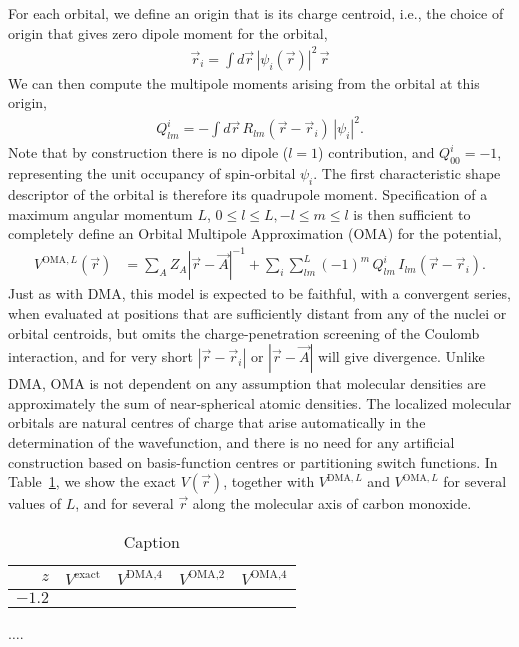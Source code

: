 \documentclass[journal=jacsat,manuscript=article]{achemso}
\begin{document}
For each orbital, we define an origin that is its charge centroid, i.e., the
choice of origin that gives zero dipole moment for the orbital,
\begin{align}
  \vec r_i = \int d \vec r \,|\psi_i(\vec r)|^2 \,  \vec r
\end{align}
We can then compute the multipole moments arising from the orbital at this origin,
\begin{align}
    Q^i_{lm} = -\int d\vec r \, R_{lm}(\vec r-\vec r_i) \, |\psi_i|^2
    .
\end{align}
Note that by construction there is no dipole ($l=1$) contribution, and $Q^i_{00}=-1$, representing the unit occupancy of spin-orbital $\psi_i$. The first characteristic shape descriptor of the orbital is therefore its quadrupole moment.
Specification of a maximum angular momentum $L$, $0\le l\le L, -l\le m\le l$ is then sufficient to completely define an Orbital Multipole Approximation (OMA) for the potential,
\begin{align}
    V^{\text{OMA},L}(\vec r) &=
    \sum_A Z_A |\vec r
    - \vec A|^{-1}
    +\sum_i \sum_{lm}^L(-1)^m\, Q^i_{lm}\, I_{lm}(\vec r - \vec r_i)
    .
\end{align}
Just as with DMA, this model is expected to be faithful, with a convergent series, when evaluated at positions that are sufficiently distant from any of the nuclei or orbital centroids, but omits the
charge-penetration screening of the Coulomb interaction, and for very short $|\vec r-\vec r_i|$ or $|\vec r-\vec A|$ will give divergence. Unlike DMA, OMA is not dependent on any assumption that molecular densities are approximately the sum of near-spherical atomic densities. The localized molecular orbitals are natural centres of charge that arise automatically in the determination of the wavefunction, and there is no need for any artificial construction based
on basis-function centres\cite{Stone1981} or partitioning switch functions\cite{Stone2005DistributedSets.}.
In Table~\ref{tab:1}, we show the exact $V(\vec r)$, together with
$V^{\text{DMA},L}$ and
$V^{\text{OMA},L}$ for several values of $L$, and for several $\vec r$ along the molecular axis of carbon monoxide.
\begin{table}[h]
    \centering
    \begin{tabular}{r|rrrr|}
        $z$ & $V^{\text{exact}}$ 
        &$V^{\text{DMA,4}}$
        &$V^{\text{OMA,2}}$
        &$V^{\text{OMA,4}}$
        \\
        \hline
         $-1.2$ & 
         \\
         \hline
    \end{tabular}
    \caption{Caption}
    \label{tab:1}
\end{table}
$\dots$.
\end{document}
